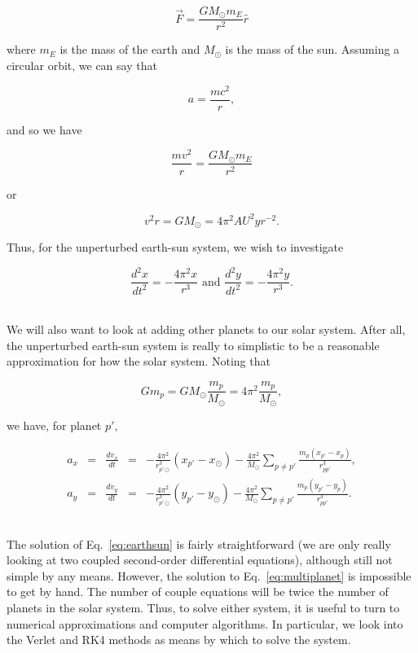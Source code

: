 \documentclass[12pt]{article}
\numberwithin{equation}{section}
\begin{document}
\begin{equation}
\label{eq:earthsunbigg}
\vec{F} = \frac{GM_{\odot}m_{E}}{r^{2}}\hat{r}
\end{equation}

\noindent where $m_{E}$ is the mass of the earth and $M_{\odot}$ is the mass of the sun.  Assuming a circular orbit, we can say that 

$$a = \frac{mc^{2}}{r},$$

\noindent and so we have

$$\frac{mv^{2}}{r} = \frac{GM_{\odot}m_{E}}{r^{2}}$$

\noindent or

$$v^{2}r = GM_{\odot} = 4\pi^{2} AU^{2}yr^{-2}.$$

\noindent Thus, for the unperturbed earth-sun system, we wish to investigate

\begin{equation}
\label{eq:earthsun}
\frac{d^{2}x}{dt^{2}} = -\frac{4\pi^{2}x}{r^{3}} \text{ and } \frac{d^{2}y}{dt^{2}} = -\frac{4\pi^{2}y}{r^{3}}.
\end{equation}

\\\indent We will also want to look at adding other planets to our solar system.  After all, the unperturbed earth-sun system is really to simplistic to be a reasonable approximation for how the solar system.  Noting that

$$Gm_{p} = GM_{\odot}\frac{m_{p}}{M_{\odot}}=4\pi^{2}\frac{m_{p}}{M_{\odot}},$$

\noindent we have, for planet $p\prime$,

\begin{equation}
\label{eq:multiplanet}
\begin{align}
a_{x} & = & \frac{dv_{x}}{dt} & = & -\frac{4\pi^{2}}{r_{p\prime\odot}^{3}}\left(x_{p\prime} - x_{\odot}\right) - \frac{4\pi^{2}}{M_{\odot}}\sum_{p\neq p\prime}\frac{m_{p}\left(x_{p\prime} - x_{p}\right)}{r_{pp\prime}^{3}}, \\
a_{y} & = & \frac{dv_{y}}{dt} & = & -\frac{4\pi^{2}}{r_{p\prime\odot}^{3}}\left(y_{p\prime} - y_{\odot}\right) - \frac{4\pi^{2}}{M_{\odot}}\sum_{p\neq p\prime}\frac{m_{p}\left(y_{p\prime} - y_{p}\right)}{r_{pp\prime}^{3}}.
\end{align}
\end{equation}

\\\indent The solution of Eq.~\ref{eq:earthsun} is fairly straightforward (we are only really looking at two coupled second-order differential equations), although still not simple by any means.  However, the solution to Eq.~\ref{eq:multiplanet} is impossible to get by hand.  The number of couple equations will be twice the number of planets in the solar system.  Thus, to solve either system, it is useful to turn to numerical approximations and computer algorithms.  In particular, we look into the Verlet and RK4 methods as means by which to solve the system.
\end{document}
